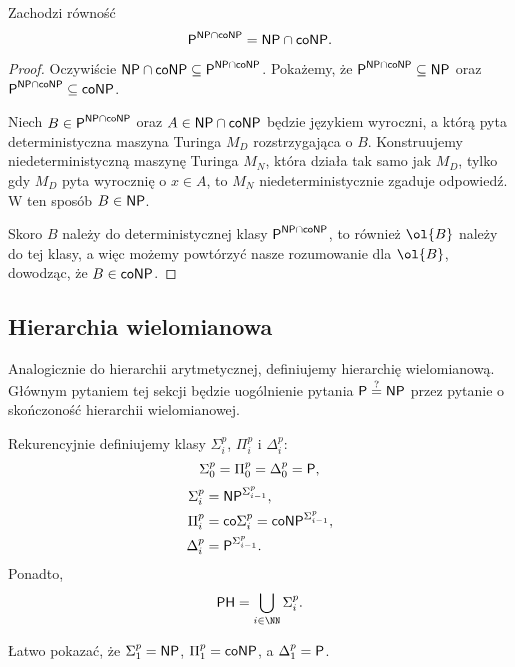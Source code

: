 \begin{fact}
    Zachodzi równość
    \[ \textsf{P}^{\textsf{NP} \cap \textsf{coNP}} = \textsf{NP} \cap \textsf{coNP}. \]
\end{fact}
\begin{proof}
    Oczywiście $\textsf{NP} \cap \textsf{coNP} \subseteq \textsf{P}^{\textsf{NP} \cap \textsf{coNP}}$. Pokażemy, że $\textsf{P}^{\textsf{NP} \cap \textsf{coNP}} \subseteq \textsf{NP}$ oraz $\textsf{P}^{\textsf{NP} \cap \textsf{coNP}} \subseteq \textsf{coNP}$.

    Niech $B \in \textsf{P}^{\textsf{NP} \cap \textsf{coNP}}$ oraz $A \in \textsf{NP} \cap \textsf{coNP}$ będzie językiem wyroczni, a którą pyta deterministyczna maszyna Turinga $M_D$ rozstrzygająca o $B$. Konstruujemy niedeterministyczną maszynę Turinga $M_N$, która działa tak samo jak $M_D$, tylko gdy $M_D$ pyta wyrocznię o $x \in A$, to $M_N$ niedeterministycznie zgaduje odpowiedź. W ten sposób $B \in \textsf{NP}$.

    Skoro $B$ należy do deterministycznej klasy $\textsf{P}^{\textsf{NP} \cap \textsf{coNP}}$, to również $\ol{B}$ należy do tej klasy, a więc możemy powtórzyć nasze rozumowanie dla $\ol{B}$, dowodząc, że $B \in \textsf{coNP}$.
\end{proof}

\subsection{Hierarchia wielomianowa}

Analogicznie do hierarchii arytmetycznej, definiujemy hierarchię wielomianową. Głównym pytaniem tej sekcji będzie uogólnienie pytania $\textsf{P} \stackrel{?}{=} \textsf{NP}$ przez pytanie o skończoność hierarchii wielomianowej.

\begin{definition}
    Rekurencyjnie definiujemy klasy $\Sigma_i^p$, $\Pi_i^p$ i $\Delta_i^p$:
    \[ \Sigma_0^p = \Pi_0^p = \Delta_0^p = \textsf{P}, \]
    \begin{align*}
        \Sigma_i^p &= \textsf{NP}^{\Sigma_{i-1}^p}, \\
        \Pi_i^p &= \textsf{co} \Sigma_i^p =  \textsf{coNP}^{\Sigma_{i-1}^p}, \\
        \Delta_i^p &= \textsf{P}^{\Sigma_{i-1}^p}.
    \end{align*}
    Ponadto,
    \[ \PHclass = \bigcup_{i \in \NN} \Sigma_i^p. \]
\end{definition}

Łatwo pokazać, że $\Sigma_1^p = \textsf{NP}$, $\Pi_1^p = \textsf{coNP}$, a $\Delta_1^p = \textsf{P}$.

